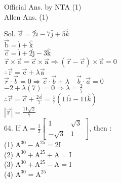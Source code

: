 \documentclass[10pt]{article}
\begin{document}
Official Ans. by NTA (1)\\
Allen Ans. (1)

Sol. \(\vec{a}=2 \hat{i}-7 \hat{j}+5 \hat{k}\)\\
\(\overrightarrow{\mathrm{b}}=\hat{\mathrm{i}}+\hat{\mathrm{k}}\)\\
\(\overrightarrow{\mathrm{c}}=\hat{\mathrm{i}}+2 \hat{\mathrm{j}}-3 \hat{\mathrm{k}}\)\\
\(\overrightarrow{\mathrm{r}} \times \overrightarrow{\mathrm{a}}=\overrightarrow{\mathrm{c}} \times \overrightarrow{\mathrm{a}} \Rightarrow(\overrightarrow{\mathrm{r}}-\overrightarrow{\mathrm{c}}) \times \overrightarrow{\mathrm{a}}=0\)\\
\(\therefore \overrightarrow{\mathrm{r}}=\overrightarrow{\mathrm{c}}+\lambda \overrightarrow{\mathrm{a}}\)\\
\(\vec{r} \cdot \vec{b}=0 \Rightarrow \vec{c} \cdot \vec{b}+\lambda \quad \vec{b} \cdot \vec{a}=0\)\\
\(-2+\lambda(7)=0 \Rightarrow \lambda=\frac{2}{7}\)\\
\(\therefore \vec{r}=\vec{c}+\frac{2 \vec{a}}{7}=\frac{1}{7}(11 \hat{i}-11 \hat{k})\)\\
\(|\overrightarrow{\mathrm{r}}|=\frac{11 \sqrt{2}}{7}\)\\
64. If \(\mathrm{A}=\frac{1}{2}\left[\begin{array}{cc}1 & \sqrt{3} \\ -\sqrt{3} & 1\end{array}\right]\), then :\\
(1) \(\mathrm{A}^{30}-\mathrm{A}^{25}=2 \mathrm{I}\)\\
(2) \(\mathrm{A}^{30}+\mathrm{A}^{25}+\mathrm{A}=\mathrm{I}\)\\
(3) \(\mathrm{A}^{30}+\mathrm{A}^{25}-\mathrm{A}=\mathrm{I}\)\\
(4) \(\mathrm{A}^{30}=\mathrm{A}^{25}\)
\end{document}
